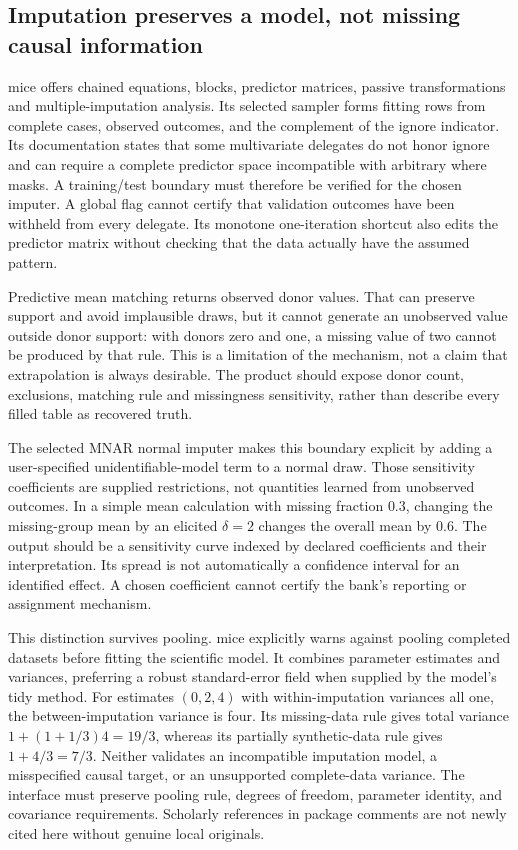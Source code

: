 \subsection{Imputation preserves a model, not missing causal information}

mice offers chained equations, blocks, predictor matrices, passive transformations and multiple-imputation analysis. Its selected sampler forms fitting rows from complete cases, observed outcomes, and the complement of the ignore indicator. Its documentation states that some multivariate delegates do not honor ignore and can require a complete predictor space incompatible with arbitrary where masks. A training/test boundary must therefore be verified for the chosen imputer. A global flag cannot certify that validation outcomes have been withheld from every delegate. Its monotone one-iteration shortcut also edits the predictor matrix without checking that the data actually have the assumed pattern.\citep{exec25_rtm_mice}

Predictive mean matching returns observed donor values. That can preserve support and avoid implausible draws, but it cannot generate an unobserved value outside donor support: with donors zero and one, a missing value of two cannot be produced by that rule. This is a limitation of the mechanism, not a claim that extrapolation is always desirable. The product should expose donor count, exclusions, matching rule and missingness sensitivity, rather than describe every filled table as recovered truth.\citep{exec25_rtm_mice,exec25_rtm_choice}

The selected MNAR normal imputer makes this boundary explicit by adding a user-specified unidentifiable-model term to a normal draw. Those sensitivity coefficients are supplied restrictions, not quantities learned from unobserved outcomes. In a simple mean calculation with missing fraction $0.3$, changing the missing-group mean by an elicited $\delta=2$ changes the overall mean by $0.6$. The output should be a sensitivity curve indexed by declared coefficients and their interpretation. Its spread is not automatically a confidence interval for an identified effect. A chosen coefficient cannot certify the bank's reporting or assignment mechanism.\citep{exec25_rtm_mice,exec25_rtm_choice}

This distinction survives pooling. mice explicitly warns against pooling completed datasets before fitting the scientific model. It combines parameter estimates and variances, preferring a robust standard-error field when supplied by the model's tidy method. For estimates $(0,2,4)$ with within-imputation variances all one, the between-imputation variance is four. Its missing-data rule gives total variance $1+(1+1/3)4=19/3$, whereas its partially synthetic-data rule gives $1+4/3=7/3$. Neither validates an incompatible imputation model, a misspecified causal target, or an unsupported complete-data variance. The interface must preserve pooling rule, degrees of freedom, parameter identity, and covariance requirements. Scholarly references in package comments are not newly cited here without genuine local originals.\citep{exec25_rtm_mice,exec25_rtm_choice}

